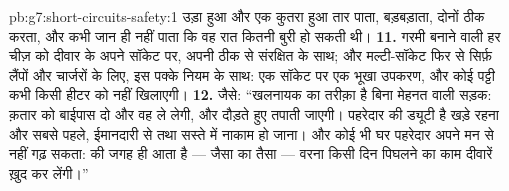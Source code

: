 \begin{solution}{pb:g7:short-circuits-safety:1}
उड़ा हुआ  और एक कुतरा हुआ तार पाता, बड़बड़ाता, दोनों ठीक करता,
और कभी जान ही नहीं पाता कि वह रात कितनी बुरी हो सकती थी।
\textbf{11.} गरमी बनाने वाली हर चीज़ को दीवार के अपने सॉकेट पर, अपनी
ठीक से संरक्षित  के साथ; और मल्टी-सॉकेट फिर से सिर्फ़ लैंपों और
चार्जरों के लिए, इस पक्के नियम के साथ: एक सॉकेट पर एक भूखा उपकरण, और
कोई पट्टी कभी किसी हीटर को नहीं खिलाएगी।
\textbf{12.} जैसे: ``खलनायक का तरीक़ा है बिना मेहनत वाली सड़क: क़तार
को बाईपास दो और वह ले लेगी, और दौड़ते हुए तपाती जाएगी। पहरेदार की
ड्यूटी है  खड़े रहना और सबसे पहले, ईमानदारी से तथा सस्ते में
नाकाम हो जाना। और कोई भी घर पहरेदार अपने मन से नहीं गढ़ सकता: 
की जगह  ही आता है --- जैसा का तैसा --- वरना किसी दिन पिघलने का
काम दीवारें ख़ुद कर लेंगी।''
\end{solution}
